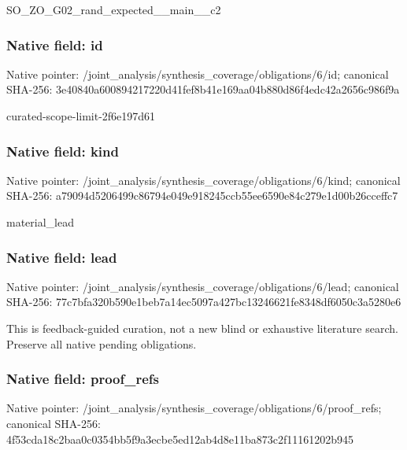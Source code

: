 \documentclass[10pt,a4paper]{article}
\begin{document}
\begingroup\raggedright\sloppy SO\_\allowbreak{}ZO\_\allowbreak{}G02\_\allowbreak{}rand\_\allowbreak{}expected\_\allowbreak{}\_\allowbreak{}main\_\allowbreak{}\_\allowbreak{}c2\par\endgroup

\subsubsection{Native field: id}
Native pointer: /joint\_\allowbreak{}analysis/synthesis\_\allowbreak{}coverage/obligations/6/id; canonical SHA-256: 3e40840a600894217220d41fef8b41e169aa04b880d86f4edc42a2656c986f9a

\begingroup\raggedright\sloppy curated-scope-limit-2f6e197d61\par\endgroup

\subsubsection{Native field: kind}
Native pointer: /joint\_\allowbreak{}analysis/synthesis\_\allowbreak{}coverage/obligations/6/kind; canonical SHA-256: a79094d5206499c86794e049e918245ccb55ee6590e84c279e1d00b26cceffc7

\begingroup\raggedright\sloppy material\_\allowbreak{}lead\par\endgroup

\subsubsection{Native field: lead}
Native pointer: /joint\_\allowbreak{}analysis/synthesis\_\allowbreak{}coverage/obligations/6/lead; canonical SHA-256: 77c7bfa320b590e1beb7a14ec5097a427bc13246621fe8348df6050c3a5280e6

\begingroup\raggedright\sloppy This is feedback-guided curation,\allowbreak{} not a new blind or exhaustive literature search. Preserve all native pending obligations.\par\endgroup

\subsubsection{Native field: proof\_\allowbreak{}refs}
Native pointer: /joint\_\allowbreak{}analysis/synthesis\_\allowbreak{}coverage/obligations/6/proof\_\allowbreak{}refs; canonical SHA-256: 4f53cda18c2baa0c0354bb5f9a3ecbe5ed12ab4d8e11ba873c2f11161202b945
\end{document}
